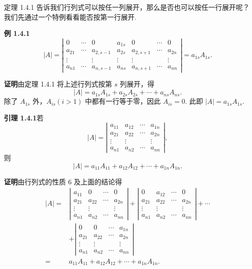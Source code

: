 \documentclass[UTF8,12pt,a4paper,fontset=fandol]{ctexart}
\begin{document}
定理 1.4.1 告诉我们行列式可以按任一列展开，那么是否也可以按任一行展开呢？我们先通过一个特例看看能否按第一行展开.

\noindent\textbf{例 1.4.1}\quad
\[
|A|=
\left|\begin{array}{ccccccc}
0 & \cdots & 0 & a_{1s} & 0 & \cdots & 0\\
a_{21} & \cdots & a_{2,s-1} & a_{2s} & a_{2,s+1} & \cdots & a_{2n}\\
\vdots & & \vdots & \vdots & \vdots & & \vdots\\
a_{n1} & \cdots & a_{n,s-1} & a_{ns} & a_{n,s+1} & \cdots & a_{nn}
\end{array}\right|
=a_{1s}A_{1s}.
\]

\noindent\textbf{证明}\quad 由定理 1.4.1 将上述行列式按第 $s$ 列展开，得
\[
|A|=a_{1s}A_{1s}+a_{2s}A_{2s}+\cdots+a_{ns}A_{ns}.
\]
除了 $A_{1s}$ 外，$A_{is}(i>1)$ 中都有一行等于零，因此 $A_{is}=0$. 此即 $|A|=a_{1s}A_{1s}$.

\noindent\textbf{引理 1.4.1}\quad 若
\begin{equation}
|A|=
\left|\begin{array}{cccc}
a_{11} & a_{12} & \cdots & a_{1n}\\
a_{21} & a_{22} & \cdots & a_{2n}\\
\vdots & \vdots & & \vdots\\
a_{n1} & a_{n2} & \cdots & a_{nn}
\end{array}\right|,
\tag{1.4.5}
\end{equation}
则
\[
|A|=a_{11}A_{11}+a_{12}A_{12}+\cdots+a_{1n}A_{1n}.
\]

\noindent\textbf{证明}\quad 由行列式的性质 6 及上面的结论得
\[
\begin{aligned}
|A|={}&
\left|\begin{array}{cccc}
a_{11} & 0 & \cdots & 0\\
a_{21} & a_{22} & \cdots & a_{2n}\\
\vdots & \vdots & & \vdots\\
a_{n1} & a_{n2} & \cdots & a_{nn}
\end{array}\right|
+
\left|\begin{array}{cccc}
0 & a_{12} & \cdots & 0\\
a_{21} & a_{22} & \cdots & a_{2n}\\
\vdots & \vdots & & \vdots\\
a_{n1} & a_{n2} & \cdots & a_{nn}
\end{array}\right|+\cdots\\
&+
\left|\begin{array}{cccc}
0 & 0 & \cdots & a_{1n}\\
a_{21} & a_{22} & \cdots & a_{2n}\\
\vdots & \vdots & & \vdots\\
a_{n1} & a_{n2} & \cdots & a_{nn}
\end{array}\right|\\
={}&a_{11}A_{11}+a_{12}A_{12}+\cdots+a_{1n}A_{1n}.
\end{aligned}
\]
\end{document}
